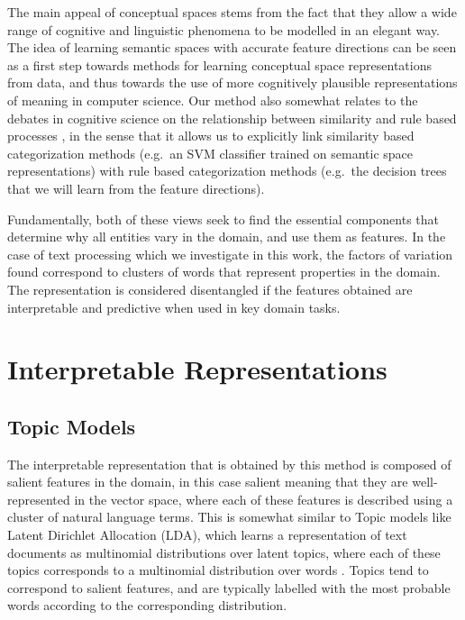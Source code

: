 The main appeal of conceptual spaces stems from the fact that they allow a wide range of cognitive and linguistic phenomena to be modelled in an elegant way. The idea of learning semantic spaces with accurate feature directions can be seen as a first step towards methods for learning conceptual space representations from data, and thus towards the use of more cognitively plausible representations of meaning in computer science. Our method also somewhat relates to the debates in cognitive science on the relationship between similarity and rule based processes  \cite{HAHN1998197}, in the sense that it allows us to explicitly link similarity based categorization methods (e.g.\ an SVM classifier trained on semantic space representations) with rule based categorization methods (e.g.\ the decision trees that we will learn from the feature directions).

Fundamentally, both of these views seek to find the essential components that determine why all entities vary in the domain, and use them as features. In the case of text processing which we investigate in this work, the factors of variation found correspond to clusters of words that represent properties in the domain. The representation is considered disentangled if the features obtained are interpretable and  predictive when used in key domain tasks.


\section{Interpretable Representations}



\subsection{Topic Models}\label{bg:TopicModels}

The interpretable representation that is obtained by this method is composed of salient features in the domain, in this case salient meaning that they are well-represented in the vector space, where each of these features is described using a cluster of natural language terms. This is somewhat similar to Topic models like Latent Dirichlet Allocation (LDA), which learns a representation of text documents as multinomial distributions over latent topics, where each of these topics corresponds to a multinomial distribution over words \cite{Blei03latentdirichlet}.  Topics tend to correspond to salient features, and are typically labelled with the most probable words according to the corresponding distribution. 

